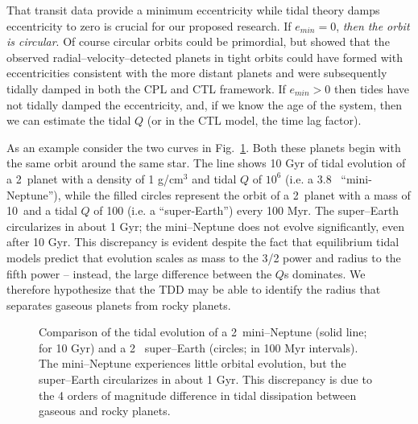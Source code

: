 \medskip
{\centerline{}}
\smallskip

That transit data provide a minimum eccentricity while tidal theory
damps eccentricity to zero is crucial for our proposed research. If
$e_{min} = 0$, \textit{then the orbit is circular}.  Of course circular
orbits could be primordial, but \cite{Jackson08,Matsumura10} showed
that the observed radial--velocity--detected planets in tight orbits
could have formed with eccentricities consistent with the more distant
planets and were subsequently tidally damped in both the CPL and CTL
framework.  If $e_{min} > 0$ then tides have not tidally damped the
eccentricity, and, if we know the age of the system, then we can
estimate the tidal $Q$ (or in the CTL model, the time lag factor).

As an example consider the two curves in Fig.~\ref{fig:compareQ}.
Both these planets begin with the same orbit around the same star.
The line shows 10 Gyr of tidal evolution of a 2~\rearth planet with a
density of 1 g/cm$^3$ and tidal $Q$ of $10^6$ (i.e. a 3.8~\mearth
``mini-Neptune''), while the filled circles represent the orbit of a
2~\rearth planet with a mass of 10~\mearth and a tidal $Q$ of 100
(i.e. a ``super-Earth'') every 100 Myr.  The super--Earth circularizes
in about 1 Gyr; the mini--Neptune does not evolve significantly, even
after 10 Gyr.  This discrepancy is evident despite the fact that
equilibrium tidal models predict that evolution scales as mass to the
3/2 power and radius to the fifth power -- instead, the large
difference between the $Q$s dominates.  We therefore hypothesize that
the TDD may be able to identify the radius that separates gaseous
planets from rocky planets.

\begin{figure}[h]
\centering
\begin{minipage}{2.7in}
\end{minipage}
\begin{minipage}{2.7in}
\caption{\label{fig:compareQ}Comparison of the tidal evolution of a
  2~\rearth mini--Neptune (solid line; for 10 Gyr) and a 2~\rearth
  super--Earth (circles; in 100 Myr intervals).  The mini--Neptune
  experiences little orbital evolution, but the super--Earth
  circularizes in about 1 Gyr.  This discrepancy is due to the 4
  orders of magnitude difference in tidal dissipation between gaseous
  and rocky planets.}
\end{minipage}
\end{figure}

